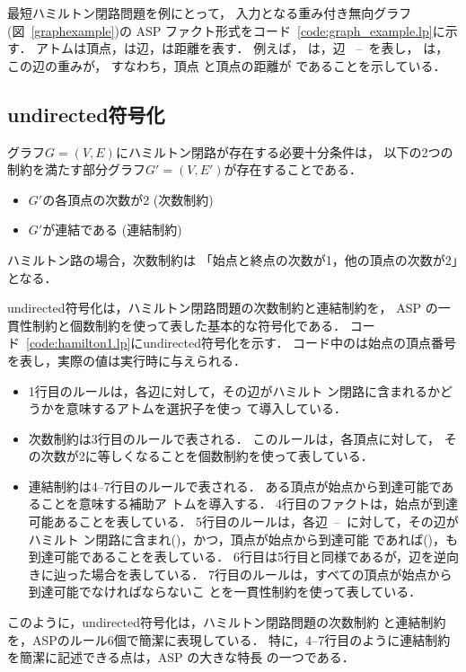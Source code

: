 最短ハミルトン閉路問題を例にとって，
入力となる重み付き無向グラフ(図~\ref{graphexample})の
ASP ファクト形式をコード~\ref{code:graph_example.lp}に示す．
%
アトムは頂点，は辺，は距離を表す．
例えば，
は，辺
~--~を表し，
は，この辺の重みが，
すなわち，頂点 と頂点の距離が
であることを示している．

\subsection{\textsf{undirected}符号化}



グラフ$G=(V,E)$にハミルトン閉路が存在する必要十分条件は，
以下の2つの制約を満たす部分グラフ$G'=(V,E')$が存在することである．
\begin{itemize}
\item $G'$の各頂点の次数が2 (次数制約)
\item $G'$が連結である (連結制約)
\end{itemize}
ハミルトン路の場合，次数制約は
「始点と終点の次数が1，他の頂点の次数が2」となる．

\textsf{undirected}符号化は，ハミルトン閉路問題の次数制約と連結制約を，
ASP の一貫性制約と個数制約を使って表した基本的な符号化である．
コード~\ref{code:hamilton1.lp}に\textsf{undirected}符号化を示す．
コード中のは始点の頂点番号を表し，実際の値は実行時に与えられる．
\begin{itemize}
\item 1行目のルールは，各辺に対して，その辺がハミルト
  ン閉路に含まれるかどうかを意味するアトムを選択子を使っ
  て導入している．
\item 次数制約は3行目のルールで表される．
  このルールは，各頂点に対して，
  その次数が2に等しくなることを個数制約を使って表している．
\item 連結制約は4--7行目のルールで表される．
  ある頂点が始点から到達可能であることを意味する補助ア
  トムを導入する．
  4行目のファクトは，始点が到達可能あることを表している．
  5行目のルールは，各辺~--~に対して，その辺がハミルト
  ン閉路に含まれ()，かつ，頂点が始点から到達可能
  であれば()，も到達可能であることを表している．
  6行目は5行目と同様であるが，辺を逆向きに辿った場合を表している．
  7行目のルールは，すべての頂点が始点から到達可能でなければならないこ
  とを一貫性制約を使って表している．
\end{itemize}
このように，\textsf{undirected}符号化は，ハミルトン閉路問題の次数制約
と連結制約を，ASPのルール6個で簡潔に表現している．
特に，4--7行目のように連結制約を簡潔に記述できる点は，ASP の大きな特長
の一つである．

